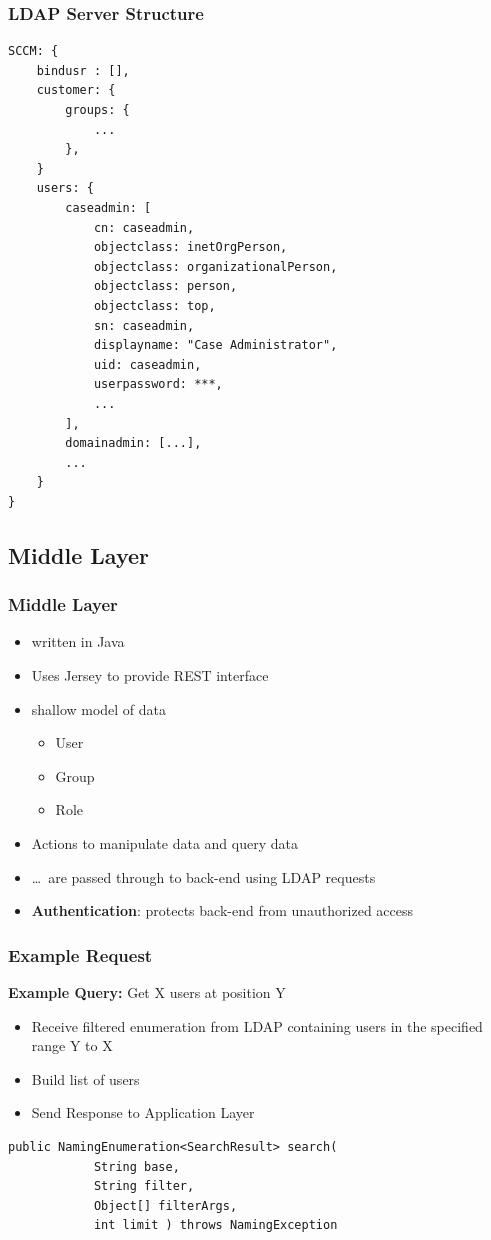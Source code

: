 \documentclass{beamer}
\begin{document}
\begin{frame}[fragile]
	\frametitle{LDAP Server Structure}
	\lstset{%
		basicstyle=\tiny
	}
	\begin{lstlisting}
SCCM: {
	bindusr : [],
	customer: {
		groups: {
			...
		},
	}
	users: {
		caseadmin: [
			cn: caseadmin,
			objectclass: inetOrgPerson,
			objectclass: organizationalPerson,
			objectclass: person,
			objectclass: top,
			sn: caseadmin,
			displayname: "Case Administrator",
			uid: caseadmin,
			userpassword: ***,
			...
		],
		domainadmin: [...],
		...
	}
}
	\end{lstlisting}
\end{frame}

\subsection{Middle Layer}

\begin{frame}
	\frametitle{Middle Layer}
	\begin{itemize}
		\item written in Java
		\item Uses Jersey to provide REST interface
		\item shallow model of data
			\begin{itemize}
				\item User
				\item Group
				\item Role
			\end{itemize}
		\item Actions to manipulate data and query data
		\item \dots\ are passed through to back-end using LDAP requests
		\item \textbf{Authentication}: protects back-end from
			unauthorized access
	\end{itemize}
\end{frame}

\begin{frame}[fragile]
	\frametitle{Example Request}
	\textbf{Example Query:} Get X users at position Y
	\begin{itemize}
	 \item Receive filtered enumeration from LDAP containing users in the specified range Y to X
	 \item Build list of users
	 \item Send Response to Application Layer
	\end{itemize}
\begin{lstlisting}[frame=single]
public NamingEnumeration<SearchResult> search(
            String base,
            String filter,
            Object[] filterArgs,
            int limit ) throws NamingException
\end{lstlisting}
\end{frame}
\end{document}
